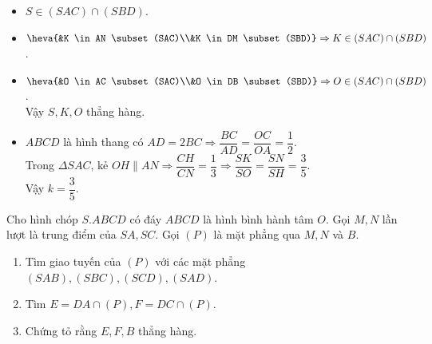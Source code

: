 \begin{bt}
\begin{bt}
{\begin{enumerate}
\begin{center}
\begin{tikzpicture}[scale=1, font=\footnotesize, line join=round, line cap=round, >=stealth]
				\end{tikzpicture}
			\end{center}
			\begin{itemize}
				\item $S \in (SAC) \cap (SBD)$.
				\item $\heva{&K \in AN \subset (SAC)\\&K \in DM \subset (SBD)} \Rightarrow K \in (SAC) \cap (SBD)$.
				\item $\heva{&O \in AC \subset (SAC)\\&O \in DB \subset (SBD)} \Rightarrow O \in (SAC) \cap (SBD)$.\\
				Vậy $S,K,O$ thẳng hàng.
				\item $ABCD$ là hình thang có $AD = 2BC \Rightarrow \dfrac{BC}{AD}=\dfrac{OC}{OA}=\dfrac{1}{2}$.\\
				Trong  $\Delta SAC$, kẻ $OH \parallel AN \Rightarrow \dfrac{CH}{CN}=\dfrac{1}{3} \Rightarrow \dfrac{SK}{SO}=\dfrac{SN}{SH}=\dfrac{3}{5}$.\\
				Vậy $k =\dfrac{3}{5}$.
			\end{itemize}
		\end{enumerate}
	}
\end{bt}
\begin{bt}%
	Cho hình chóp $S.ABCD$ có đáy $ABCD$ là hình bình hành tâm $O$. Gọi $M, N$ lần lượt là trung điểm của $SA,SC$. Gọi $(P)$ là mặt phẳng qua $M, N$ và $B$.
	\begin{enumerate}
		\item Tìm giao tuyến của $(P)$ với các mặt phẳng $(SAB), (SBC), (SCD), (SAD)$.
		\item Tìm $E=DA \cap (P), F=DC \cap (P)$.
		\item Chứng tỏ rằng $E, F, B$ thẳng hàng.
	\end{enumerate}
\end{bt}
\end{bt}
